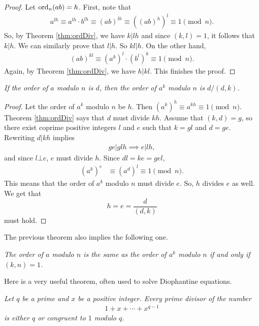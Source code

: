 \documentclass{subfile}
\begin{document}
	\begin{proof}
		Let $\operatorname{ord}_n(ab)=h$. First, note that
			\begin{align*}
				a^{lh} \equiv a^{lh} \cdot b^{lh} \equiv (ab)^{lh} \equiv \left((ab)^h\right)^l \equiv 1 \pmod n.
			\end{align*}
		So, by Theorem \ref{thm:ordDiv}, we have $k|lh$ and since $(k,l)=1$, it follows that $k|h$. We can similarly prove that $l|h$. So $kl|h$. On the other hand,
			\begin{align*}
				(ab)^{kl} \equiv (a^k)^l \cdot (b^l)^k \equiv 1 \pmod n.
			\end{align*}
		Again, by Theorem \eqref{thm:ordDiv}, we have $h|kl$. This finishes the proof.
	\end{proof}
	
	\begin{theorem}\slshape
		If the order of $a$ modulo $n$ is $d$, then the order of $a^k$ modulo $n$ is $d/{(d,k)}$.
	\end{theorem}
	
	\begin{proof}
		Let the order of $a^k$ modulo $n$ be $h$. Then $\left(a^k\right)^h \equiv a^{kh} \equiv 1\pmod n$. Theorem \ref{thm:ordDiv} says that $d$ must divide $kh$. Assume that $(k,d)=g$, so there exist coprime positive integers $l$ and $e$ such that $k=gl$ and $d=ge$. Rewriting $d | kh$ implies
			\begin{align*}
				ge|glh \implies e|lh,
			\end{align*}
		and since $l\bot e$, $e$ must divide $h$. Since $dl=ke=gel$,
			\begin{align*}
				\left(a^k\right)^{e} & \equiv \left(a^d\right)^{l} \equiv 1\pmod n.
			\end{align*}
		This means that the order of $a^k$ modulo $n$ must divide $e$. So, $h$ divides $e$ as well. We get that $$h=e=\dfrac{d}{(d,k)}$$ must hold. 
	\end{proof}
The previous theorem also implies the following one.
	\begin{theorem}\slshape
		The order of $a$ modulo $n$ is the same as the order of $a^k$ modulo $n$ if and only if $(k,n)=1$.
	\end{theorem}
Here is a very useful theorem, often used to solve Diophantine equations.
	\begin{theorem}\label{thm:cyclodiv}\slshape
		Let $q$ be a prime and $x$ be a positive integer. Every prime divisor of the number
			\begin{align*}
				1+x+\cdots+x^{q-1}
			\end{align*}
		is either $q$ or congruent to $1$ modulo $q$.
	\end{theorem}
	
\end{document}
